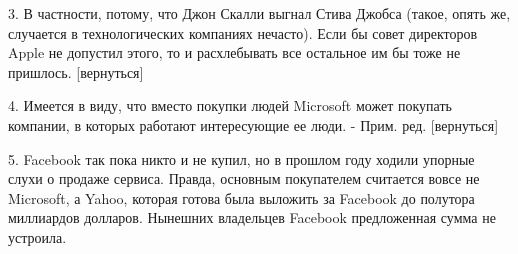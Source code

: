 \documentclass[ebook,12pt,oneside,openany]{memoir}
\begin{document}
3. В частности, потому, что Джон Скалли выгнал Стива Джобса (такое,
опять же, случается в технологических компаниях нечасто). Если бы
совет директоров Apple не допустил этого, то и расхлебывать все
остальное им бы тоже не пришлось. [вернуться]

4. Имеется в виду, что вместо покупки людей Microsoft может покупать
компании, в которых работают интересующие ее люди. - Прим. ред.
[вернуться]

5. Facebook так пока никто и не купил, но в прошлом году ходили
упорные слухи о продаже сервиса. Правда, основным покупателем
считается вовсе не Microsoft, а Yahoo, которая готова была выложить за
Facebook до полутора миллиардов долларов. Нынешних владельцев Facebook
предложенная сумма не устроила.
\end{document}
